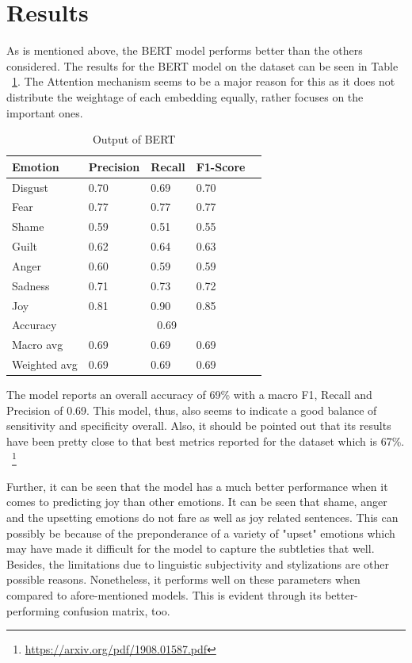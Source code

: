 \documentclass[11pt]{article}
\begin{document}
\section{Results}
\label{sec:result}

As is mentioned above, the BERT model performs better than the others considered. The results for the BERT model on the dataset can be seen in Table ~\ref{tab:modelpre}. The Attention mechanism seems to be a major reason for this as it does not distribute the weightage of each embedding equally, rather focuses on the important ones.

\begin{table}[h]
    \centering
    \begin{tabular}{lllll}
    \toprule
    Emotion & Precision & Recall & F1-Score \\
    \midrule
    Disgust  & 0.70 & 0.69 &  0.70 \\   
    Fear  & 0.77 & 0.77 &  0.77 \\
    Shame  & 0.59 & 0.51 &  0.55 \\
    Guilt  & 0.62 & 0.64 &  0.63 \\
    Anger  & 0.60 & 0.59 &  0.59 \\
    Sadness  & 0.71 & 0.73 &  0.72 \\
    Joy  & 0.81 & 0.90 &  0.85 \\
    \midrule
    Accuracy & \multicolumn{3}{c}{0.69} \\
    Macro avg & 0.69 & 0.69 & 0.69 \\
    Weighted avg & 0.69 & 0.69 & 0.69
    \bottomrule
    \end{tabular}
    \caption{Output of BERT}
    \label{tab:modelpre}
\end{table}

The model reports an overall accuracy of 69\% with a macro F1, Recall and Precision of 0.69. This model, thus, also seems to indicate a good balance of sensitivity and specificity overall. Also, it should be pointed out that its results have been pretty close to that best metrics reported for the dataset which is 67\%. ~\footnote{\url{https://arxiv.org/pdf/1908.01587.pdf}}		

\newline
Further, it can be seen that the model has a much better performance when it comes to predicting joy than other emotions. It can be seen that shame, anger and the upsetting emotions do not fare as well as joy related sentences. This can possibly be because of the preponderance of a variety of "upset" emotions which may have made it difficult for the model to capture the subtleties that well. Besides, the limitations due to linguistic subjectivity and stylizations are other possible reasons. Nonetheless, it performs well on these parameters when compared to afore-mentioned models. This is evident through its better-performing confusion matrix, too. 
\end{document}
